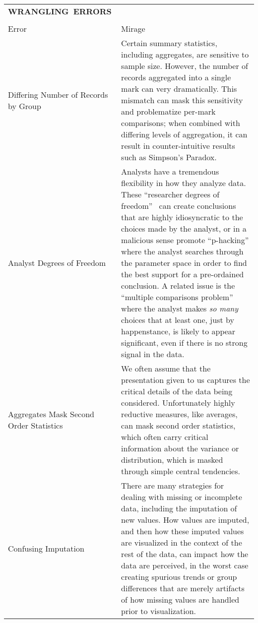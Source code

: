 \begin{longtable}{>{\raggedright\arraybackslash}p{3cm}p{14cm}}
  \\\hbox{\normalsize{\textbf{WRANGLING ERRORS}}}&\\ \\
  \normalsize{Error} & \normalsize{Mirage}\\ \hline
   \rowcolor{colorb}Differing Number  of Records by  Group  & Certain summary statistics, including aggregates, are sensitive to sample size. However, the number of records aggregated into a single mark can very dramatically. This mismatch can mask this sensitivity and problematize per-mark comparisons; when combined with differing levels of aggregation, it can result in counter-intuitive results such as Simpson's Paradox. \cite{guo2017you}\\
 \rowcolor{colorb-opaque}Analyst Degrees of Freedom  & Analysts have a tremendous flexibility in how they analyze data. These ``researcher degrees of freedom''~\cite{gelman2013garden} can create conclusions that are highly idiosyncratic to the choices made by the analyst, or in a malicious sense promote ``p-hacking'' where the analyst searches through the parameter space in order to find the best support for a pre-ordained conclusion. A related issue is the ``multiple comparisons problem'' where the analyst makes \emph{so many} choices that at least one, just by happenstance, is likely to appear significant, even if there is no strong signal in the data. \cite{gelman2013garden,pu2018garden,zgraggen2018investigating}\\
 \rowcolor{colorb}Aggregates Mask Second Order Statistics  & We often assume that the presentation given to us captures the critical details of the data being considered. Unfortunately highly reductive measures, like averages, can mask second order statistics, which often carry critical information about the variance or distribution, which is masked through simple central tendencies.  \cite{wall2017warning, few2019loom, matejka2017same, anscombe1973graphs, salimi2018bias}\\
 \rowcolor{colorb-opaque}Confusing Imputation  & There are many strategies for dealing with missing or incomplete data, including the imputation of new values. How values are imputed, and then how these imputed values are visualized in the context of the rest of the data, can impact how the data are perceived, in the worst case creating spurious trends or group differences that are merely artifacts of how missing values are handled prior to visualization. \cite{song2018s}\\

\end{longtable}
